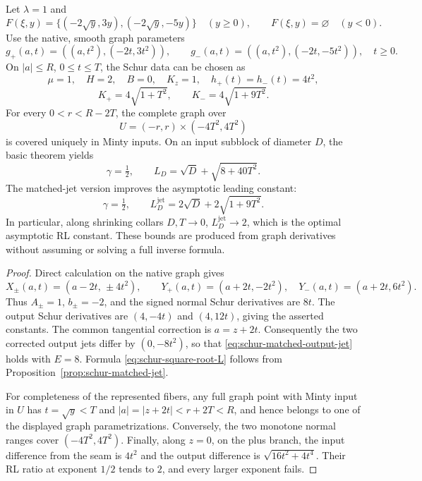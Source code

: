 \begin{proposition}
\label{prop:schur-square-root-test}
Let \(\lambda=1\) and
\[
 F(\xi,y)=\{(-2\sqrt y,3y),(-2\sqrt y,-5y)\}\quad(y\ge0),
 \qquad F(\xi,y)=\varnothing\quad(y<0).
\]
Use the native, smooth graph parameters
\[
 g_+(a,t)=((a,t^2),(-2t,3t^2)),\qquad
 g_-(a,t)=((a,t^2),(-2t,-5t^2)),\quad t\ge0.
\]
On \(|a|\le R\), \(0\le t\le T\), the Schur data can be chosen as
\[
 \mu=1,\quad H=2,\quad B=0,\quad K_z=1,\quad
 h_+(t)=h_-(t)=4t^2,
\]
\[
 K_+=4\sqrt{1+T^2},\qquad K_-=4\sqrt{1+9T^2}.
\]
For every \(0<r<R-2T\), the complete graph over
\[
 U=(-r,r)\times(-4T^2,4T^2)
\]
is covered uniquely in Minty inputs.  On an input subblock of diameter
\(D\), the basic theorem yields
\[
 \gamma=\tfrac12,\qquad L_D=\sqrt D+\sqrt{8+40T^2}.
\]
The matched-jet version improves the asymptotic leading constant:
\[
 \gamma=\tfrac12,\qquad
 L_D^{\mathrm{jet}}=2\sqrt D+2\sqrt{1+9T^2}.
 \tag{S18}\label{eq:schur-square-root-L}
\]
In particular, along shrinking collars \(D,T\to0\),
\(L_D^{\mathrm{jet}}\to2\), which is the optimal asymptotic RL
constant.  These bounds are produced from graph derivatives without
assuming or solving a full inverse formula.
\end{proposition}
\begin{proof}
Direct calculation on the native graph gives
\[
 X_\pm(a,t)=(a-2t,\,\pm4t^2),\qquad
 Y_+(a,t)=(a+2t,-2t^2),\quad
 Y_-(a,t)=(a+2t,6t^2).
\]
Thus \(A_\pm=1\), \(b_\pm=-2\), and the signed normal Schur
derivatives are \(8t\).  The output Schur derivatives are
\((4,-4t)\) and \((4,12t)\), giving the asserted constants.
The common tangential correction is \(a=z+2t\).  Consequently the
two corrected output jets differ by \((0,-8t^2)\), so that
\eqref{eq:schur-matched-output-jet} holds with \(E=8\).  Formula
\eqref{eq:schur-square-root-L} follows from
Proposition~\ref{prop:schur-matched-jet}.

For completeness of the represented fibers, any full graph point with Minty
input in \(U\) has \(t=\sqrt y<T\) and
\(|a|=|z+2t|<r+2T<R\), and hence belongs to one of the displayed
graph parametrizations.  Conversely, the two monotone normal ranges
cover \((-4T^2,4T^2)\).  Finally, along \(z=0\), on the plus branch,
the input difference from the seam is \(4t^2\) and the output
difference is \(\sqrt{16t^2+4t^4}\).  Their RL ratio at exponent
\(1/2\) tends to \(2\), and every larger exponent fails.
\end{proof}

